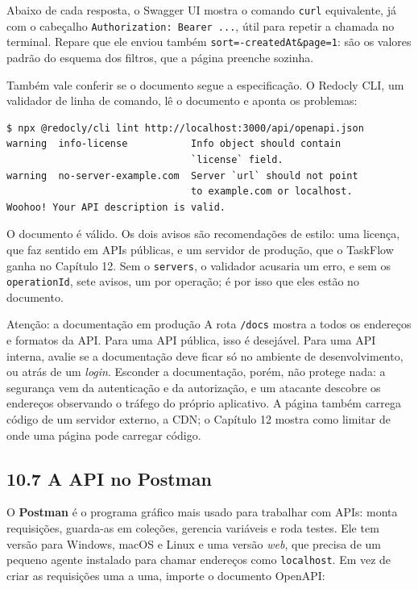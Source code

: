 Abaixo de cada resposta, o Swagger UI mostra o comando \texttt{curl} equivalente, já com o cabeçalho \texttt{Authorization: Bearer ...}, útil para repetir a chamada no terminal. Repare que ele enviou também \texttt{sort=-createdAt\&page=1}: são os valores padrão do esquema dos filtros, que a página preenche sozinha.

Também vale conferir se o documento segue a especificação. O Redocly CLI, um validador de linha de comando, lê o documento e aponta os problemas:

\begin{codigo}
\begin{Verbatim}[breaklines=true, breaksymbolleft={}, fontsize=\footnotesize]
$ npx @redocly/cli lint http://localhost:3000/api/openapi.json
warning  info-license           Info object should contain
                                `license` field.
warning  no-server-example.com  Server `url` should not point
                                to example.com or localhost.
Woohoo! Your API description is valid.
\end{Verbatim}
\end{codigo}

O documento é válido. Os dois avisos são recomendações de estilo: uma licença, que faz sentido em APIs públicas, e um servidor de produção, que o TaskFlow ganha no Capítulo 12. Sem o \texttt{servers}, o validador acusaria um erro, e sem os \texttt{operationId}, sete avisos, um por operação; é por isso que eles estão no documento.

\begin{destaque}{Atenção: a documentação em produção}
A rota \texttt{/docs} mostra a todos os endereços e formatos da API. Para uma API pública, isso é desejável. Para uma API interna, avalie se a documentação deve ficar só no ambiente de desenvolvimento, ou atrás de um \textit{login}. Esconder a documentação, porém, não protege nada: a segurança vem da autenticação e da autorização, e um atacante descobre os endereços observando o tráfego do próprio aplicativo. A página também carrega código de um servidor externo, a CDN; o Capítulo 12 mostra como limitar de onde uma página pode carregar código.
\end{destaque}

\subsection{10.7 A API no Postman}

O \textbf{Postman} é o programa gráfico mais usado para trabalhar com APIs: monta requisições, guarda-as em coleções, gerencia variáveis e roda testes. Ele tem versão para Windows, macOS e Linux e uma versão \textit{web}, que precisa de um pequeno agente instalado para chamar endereços como \texttt{localhost}. Em vez de criar as requisições uma a uma, importe o documento OpenAPI:

